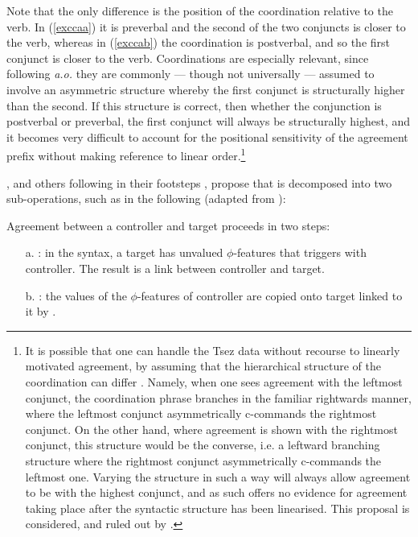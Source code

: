 \documentclass[output=paper
,modfonts
,nonflat]{langsci/langscibook}
\begin{document}
\noindent Note that the only difference is the position of the coordination relative to the verb.
In (\ref{exccaa}) it is preverbal and the second of the two conjuncts is closer to the verb, whereas in (\ref{exccab}) the coordination is postverbal, and so the first conjunct is closer to the verb.
Coordinations are especially relevant, since following \citet{munn1993} \emph{a.o.} they are commonly --- though not universally \citep[see][]{borsley2005} --- assumed to involve an asymmetric structure whereby the first conjunct is structurally higher than the second.
If this structure is correct, then whether the conjunction is postverbal or preverbal, the first conjunct will always be structurally highest, and it becomes very difficult to account for the positional sensitivity of the agreement prefix without making reference to linear order.\footnote{It is possible that one can handle the Tsez data without recourse to linearly motivated agreement, by assuming that the hierarchical structure of the coordination can differ \citep[cf.][]{johannessen1996}.
	Namely, when one sees agreement with the leftmost conjunct, the coordination phrase branches in the familiar rightwards manner, where the leftmost conjunct asymmetrically c-commands the rightmost conjunct.
	On the other hand, where agreement is shown with the rightmost conjunct, this structure would be the converse, i.e. a leftward branching structure where the rightmost conjunct asymmetrically c-commands the leftmost one.
	Varying the structure in such a way will always allow agreement to be with the highest conjunct, and as such offers no evidence for agreement taking place after the syntactic structure has been linearised.
	This proposal is considered, and ruled out by \citet{benmamounetal2009}.}

\citet{benmamounetal2009}, and others following in their footsteps \citep[including \emph{a.o.}][]{arreginevins2012,bhattwalkow2013,smithdiss,smithagrhierarchy, smithsse},  propose that \agr {} is decomposed into two sub-operations, such as in the following (adapted from \citealp{arreginevins2012}):

\begin{exe}
	\ex
	Agreement between a controller and target proceeds in two steps: 
	\begin{itemize}
		\item[a.] \agrl: in the syntax, a target has unvalued $\phi$-features that triggers \agr {} with controller. The result is a link between controller and target.
		\item[b.] \agrc: the values of the $\phi$-features of controller are copied onto target linked to it by \agrl.
	\end{itemize}
\end{exe}
\end{document}
